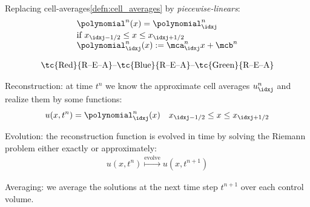 \begin{defnbox}\nospacing
    \begin{defn}[Reconstruction]\label{defn:reconstruction}\leavevmode\\
        \begin{minipage}{0.5\textwidth}
        Replacing cell-averages\cref{defn:cell_averages} by \textit{piecewise-linears}:
        \begin{align*}
          &\polynomial^{n}(x)=\polynomial_{\idxj}^{n}\\[-1\jot]
          &\text{if }x_{\idxj-1/2}\leq x\leq x_{\idxj+1/2}\\[-1\jot]
          &\polynomial_{\idxj}^{n}(x):=\mca_{\idxj}^{n}x+\mcb^{n}
        \end{align*}
        \end{minipage}
        \begin{minipage}[c]{0.45\textwidth}
            \begin{figure}[H]
                \centering{
                  \def\svgwidth{100pt}
                  \resizebox{0.85\linewidth}{!}{}
                }
            \end{figure}
        \end{minipage}
    \end{defn}
\end{defnbox}
\begin{defnbox}\nospacing
    \begin{defn}\label{defn:rea_algorithm}
        \begin{align}
          \text{\tc{Red}{R--E--A}--\tc{Blue}{R--E--A}--\tc{Green}{R--E--A}}
        \end{align}
        \begin{circlelistnosep}
            \item Reconstruction: at time $t^{n}$ we know the approximate cell averages $u_{\idxj}^{n}$ and realize them by
            some functions:
            \begin{align*}
                    u(x,t^{n})=\polynomial_{\idxj}^{n}(x)  &&x_{\idxj-1/2}\leq x \leq x_{\idxj+1/2}
            \end{align*}
            \item Evolution: the reconstruction function is evolved in time by solving the Riemann problem either exactly or approximately:
            \begin{align*}
              u(x,t^{n})\stackrel{\text{evolve}}{\mapsto}u(x,t^{n+1})
            \end{align*}
            \item Averaging: we average the solutions at the next time step $t^{n+1}$ over each control volume.
        \end{circlelistnosep}
    \end{defn}
\end{defnbox}
